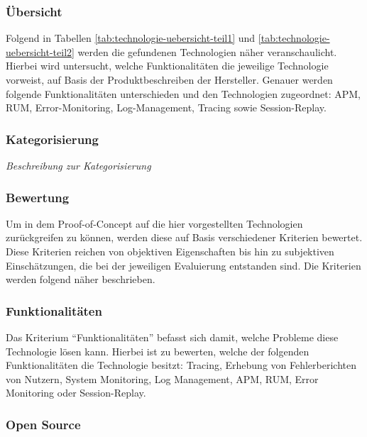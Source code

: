 \subsubsection{Übersicht}

Folgend in Tabellen \autoref*{tab:technologie-uebersicht-teil1} und \autoref*{tab:technologie-uebersicht-teil2} werden die gefundenen Technologien näher veranschaulicht. Hierbei wird untersucht, welche Funktionalitäten die jeweilige Technologie vorweist, auf Basis der Produktbeschreiben der Hersteller. Genauer werden folgende Funktionalitäten unterschieden und den Technologien zugeordnet: APM, RUM, Error-Monitoring, Log-Management, Tracing sowie Session-Replay.



\subsubsection{Kategorisierung}

\textit{Beschreibung zur Kategorisierung}



\subsubsection{Bewertung}

Um in dem Proof-of-Concept auf die hier vorgestellten Technologien zurückgreifen zu können, werden diese auf Basis verschiedener Kriterien bewertet. Diese Kriterien reichen von objektiven Eigenschaften bis hin zu subjektiven Einschätzungen, die bei der jeweiligen Evaluierung entstanden sind. Die Kriterien werden folgend näher beschrieben.

\subsubsection{Funktionalitäten}

Das Kriterium \enquote{Funktionalitäten} befasst sich damit, welche Probleme diese Technologie lösen kann. Hierbei ist zu bewerten, welche der folgenden Funktionalitäten die Technologie  besitzt: Tracing, Erhebung von Fehlerberichten von Nutzern, System Monitoring, Log Management, APM, RUM, Error Monitoring oder Session-Replay.

\subsubsection{Open Source}

